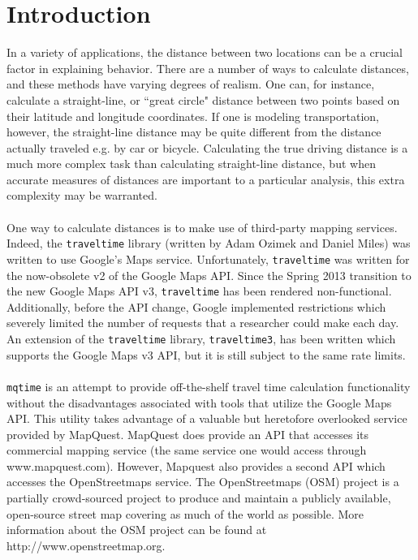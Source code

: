 \documentclass[12pt]{article}
\begin{document}
\section{Introduction}
In a variety of applications, the distance between two locations can be a crucial factor in explaining behavior. There are a number of ways to calculate distances, and these methods have varying degrees of realism. One can, for instance, calculate a straight-line, or ``great circle" distance between two points based on their latitude and longitude coordinates. If one is modeling transportation, however, the straight-line distance may be quite different from the distance actually traveled e.g. by car or bicycle. Calculating the true driving distance is a much more complex task than calculating straight-line distance, but when accurate measures of distances are important to a particular analysis, this extra complexity may be warranted.
\\ \\
One way to calculate distances is to make use of third-party mapping services. Indeed, the \verb|traveltime| library (written by Adam Ozimek and Daniel Miles) was written to use Google's Maps service. Unfortunately, \verb|traveltime| was written for the now-obsolete v2 of the Google Maps API. Since the Spring 2013 transition to the new Google Maps API v3, \verb|traveltime| has been rendered non-functional. Additionally, before the API change, Google implemented restrictions which severely limited the number of requests that a researcher could make each day. An extension of the \verb|traveltime| library, \verb|traveltime3|, has been written which supports the Google Maps v3 API, but it is still subject to the same rate limits. 
\\ \\
\verb|mqtime| is an attempt to provide off-the-shelf travel time calculation functionality without the disadvantages associated with tools that utilize the Google Maps API. This utility takes advantage of a valuable but heretofore overlooked service provided by MapQuest. MapQuest does provide an API that accesses its commercial mapping service (the same service one would access through www.mapquest.com). However, Mapquest also provides a second API which accesses the OpenStreetmaps service. The OpenStreetmaps (OSM) project is a partially crowd-sourced project to produce and maintain a publicly available, open-source street map covering as much of the world as possible. More information about the OSM project can be found at http://www.openstreetmap.org. 
\end{document}
